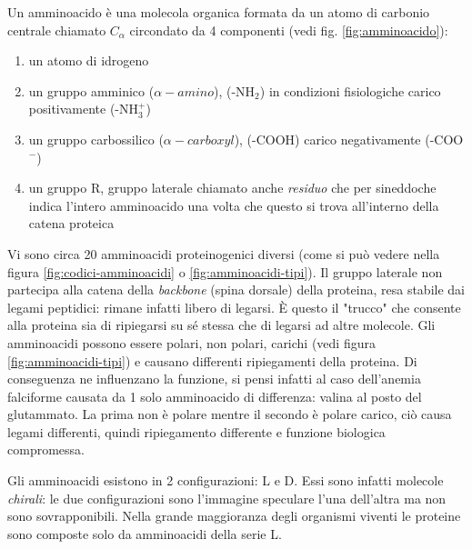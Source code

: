 \par Un amminoacido è una molecola organica formata da un atomo di carbonio centrale chiamato $C_{\alpha}$ circondato da 4 componenti (vedi fig. \ref{fig:amminoacido}):
\begin{enumerate}
	\item un atomo di idrogeno
	\item un gruppo amminico ($\alpha-amino$), (-NH$_{2}$) in condizioni fisiologiche carico positivamente (-NH$_{3}^{+}$) 
	\item un gruppo carbossilico ($\alpha-carboxyl$), (-COOH) carico negativamente (-COO$^{-}$)
	\item un gruppo R, gruppo laterale chiamato anche \textit{residuo} che per sineddoche indica l'intero amminoacido una volta che questo si trova all'interno della catena proteica
\end{enumerate}

Vi sono circa 20 amminoacidi proteinogenici diversi (come si può vedere nella figura \ref{fig:codici-amminoacidi} o \ref{fig:amminoacidi-tipi}). Il gruppo laterale non partecipa alla catena della \textit{backbone} (spina dorsale) della proteina, resa stabile dai legami peptidici: rimane infatti libero di legarsi. È questo il "trucco" che consente alla proteina sia di ripiegarsi su sé stessa che di legarsi ad altre molecole. Gli amminoacidi possono essere polari, non polari, carichi (vedi figura \ref{fig:amminoacidi-tipi}) e causano differenti ripiegamenti della proteina. Di conseguenza ne influenzano la funzione, si pensi infatti al caso dell'anemia falciforme causata da 1 solo amminoacido di differenza: valina al posto del glutammato. La prima non è polare mentre il secondo è polare carico, ciò causa legami differenti, quindi ripiegamento differente e funzione biologica compromessa. 

\par Gli amminoacidi esistono in 2 configurazioni: L e D. Essi sono infatti molecole \textit{chirali}: le due configurazioni sono l'immagine speculare l'una dell'altra ma non sono sovrapponibili. Nella grande maggioranza degli organismi viventi le proteine sono composte solo da amminoacidi della serie L.

